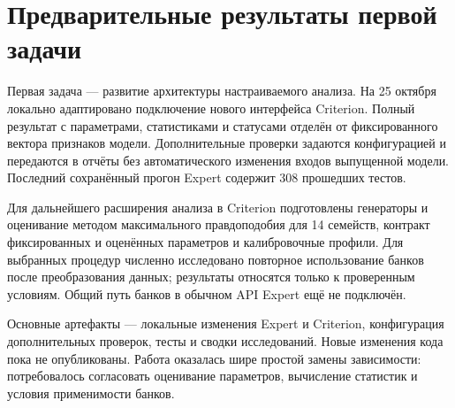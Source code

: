 \section{Предварительные результаты первой задачи}
\label{sec:solution}

Первая задача --- развитие архитектуры настраиваемого анализа.
На 25 октября локально адаптировано подключение нового интерфейса
Criterion. Полный результат с параметрами, статистиками и статусами
отделён от фиксированного вектора признаков модели. Дополнительные
проверки задаются конфигурацией и передаются в отчёты без автоматического
изменения входов выпущенной модели. Последний сохранённый прогон Expert
содержит 308 прошедших тестов.

Для дальнейшего расширения анализа в Criterion подготовлены генераторы
и оценивание методом максимального правдоподобия для 14 семейств,
контракт фиксированных и оценённых параметров и калибровочные профили.
Для выбранных процедур численно исследовано повторное использование
банков после преобразования данных; результаты относятся только
к проверенным условиям. Общий путь банков в обычном API Expert
ещё не подключён.

Основные артефакты --- локальные изменения Expert и Criterion,
конфигурация дополнительных проверок, тесты и сводки исследований.
Новые изменения кода пока не опубликованы.
Работа оказалась шире простой замены зависимости: потребовалось согласовать
оценивание параметров, вычисление статистик и условия применимости банков.
